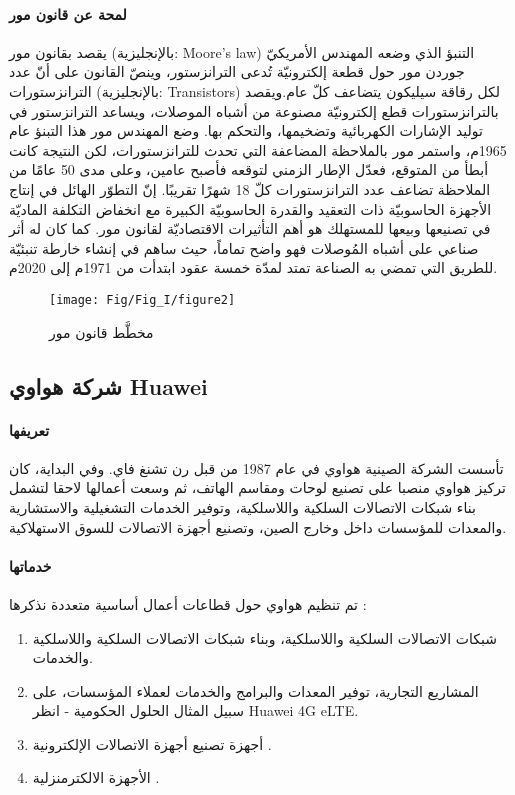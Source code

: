 \paragraph{لمحة عن قانون مور} 
يقصد بقانون مور (بالإنجليزية: Moore's law) التنبؤ الذي وضعه المهندس الأمريكيّ جوردن مور حول قطعة إلكترونيّة تُدعى الترانزستور، وينصّ القانون على أنّ عدد الترانزستورات (بالإنجليزية: Transistors) لكل رقاقة سيليكون يتضاعف كلّ عام.ويقصد بالترانزستورات قطع إلكترونيّة مصنوعة من أشباه الموصلات، ويساعد الترانزستور في توليد الإشارات الكهربائية وتضخيمها، والتحكم بها. وضع المهندس مور هذا التبنؤ عام 1965م، واستمر مور بالملاحظة المضاعفة التي تحدث للترانزستورات، لكن النتيجة كانت أبطأ من المتوقع، فعدّل الإطار الزمني لتوقعه فأصبح عامين، وعلى مدى 50 عامًا من الملاحظة تضاعف عدد الترانزستورات كلّ 18 شهرًا تقريبًا.
إنّ التطوّر الهائل في إنتاج الأجهزة الحاسوبيّة ذات التعقيد والقدرة الحاسوبيّة الكبيرة مع انخفاض التكلفة الماديّة في تصنيعها وبيعها للمستهلك هو أهم التأثيرات الاقتصاديّة لقانون مور.
كما كان له أثر صناعي على أشباه المُوصلات فهو واضح تماماً، حيث ساهم في إنشاء خارطة تنبئيّة للطريق التي تمضي به الصناعة تمتد لمدّة خمسة عقود ابتدأت من 1971م إلى 2020م. 

\begin{figure}[h]
	\centering
	\texttt{[image: Fig/Fig\_I/figure2]}
	\caption{ مخطَّط قانون مور }
	\label{fig:figure2}
\end{figure}
\FloatBarrier

\subsection{ شركة هواوي Huawei }

\paragraph{تعريفها}
تأسست الشركة الصينية هواوي في عام 1987 من قبل رن تشنغ فاي. وفي البداية، كان تركيز هواوي منصبا على تصنيع لوحات ومقاسم الهاتف، ثم وسعت أعمالها لاحقا لتشمل بناء شبكات الاتصالات السلكية واللاسلكية، وتوفير الخدمات التشغيلية والاستشارية   والمعدات للمؤسسات داخل وخارج الصين، وتصنيع أجهزة الاتصالات للسوق الاستهلاكية. \cite{a10}

\paragraph{خدماتها}
تم تنظيم هواوي حول قطاعات أعمال أساسية متعددة نذكرها :
\begin{enumerate}
	\item
	شبكات الاتصالات السلكية واللاسلكية، وبناء شبكات الاتصالات السلكية واللاسلكية والخدمات.
	\item
	المشاريع التجارية، توفير المعدات والبرامج والخدمات لعملاء المؤسسات، على سبيل المثال الحلول الحكومية - انظر Huawei 4G eLTE.
	\item
	أجهزة تصنيع أجهزة الاتصالات الإلكترونية .
	\item
	الأجهزة الالكترمنزلية . \cite{a14}
\end{enumerate}
